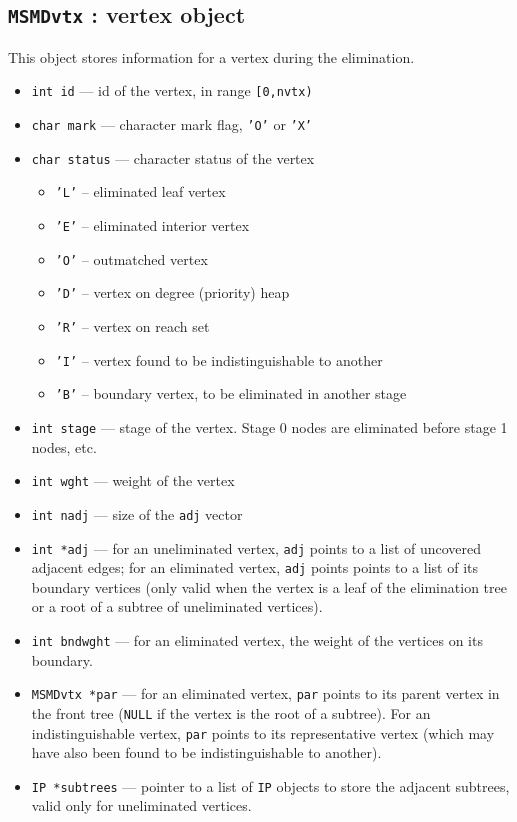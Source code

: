 \subsection{{\tt MSMDvtx} : vertex object}
\par
This object stores information for a vertex during the elimination.
\par
\begin{itemize}
\item
{\tt int id} --- id of the vertex, in range {\tt [0,nvtx)}
\item
{\tt char mark} --- character mark flag, {\tt 'O'} or {\tt 'X'}
\item
{\tt char status} --- character status of the vertex
\begin{itemize}
\item {\tt 'L'} -- eliminated leaf vertex
\item {\tt 'E'} -- eliminated interior vertex
\item {\tt 'O'} -- outmatched vertex
\item {\tt 'D'} -- vertex on degree (priority) heap
\item {\tt 'R'} -- vertex on reach set
\item {\tt 'I'} -- vertex found to be indistinguishable to another
\item {\tt 'B'} -- boundary vertex, to be eliminated in another stage
\end{itemize}
\item
{\tt int stage} --- stage of the vertex. Stage 0 nodes are
eliminated before stage 1 nodes, etc.
\item
{\tt int wght} --- weight of the vertex
\item
{\tt int nadj} --- size of the {\tt adj} vector
\item
{\tt int *adj} --- 
for an uneliminated vertex, {\tt adj} points to a list
of uncovered adjacent edges; for an eliminated vertex, {\tt adj}
points points to a list of its boundary vertices (only valid when
the vertex is a leaf of the elimination tree or a root of a subtree
of uneliminated vertices).
\item
{\tt int bndwght} --- for an eliminated vertex, the weight of the
vertices on its boundary.
\item
{\tt MSMDvtx *par} --- for an eliminated vertex, 
{\tt par} points to its parent vertex in the front tree
({\tt NULL} if the vertex is the root of a subtree).
For an indistinguishable vertex, {\tt par} points to its
representative vertex (which may have also been found to be
indistinguishable to another).
\item
{\tt IP *subtrees} --- pointer to a list of {\tt IP} objects to store
the adjacent subtrees, valid only for uneliminated vertices.
\end{itemize}
